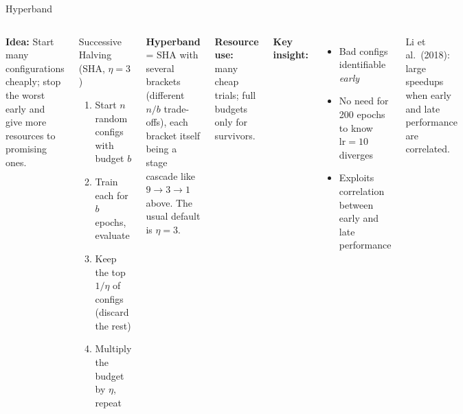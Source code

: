 \documentclass[aspectratio=169,11pt]{beamer}
\newcommand{\emphc}[1]{\textcolor{harvardcrimson}{#1}}
\begin{document}
\begin{frame}{Hyperband}
\footnotesize
\begin{columns}[T]
\textbf{Idea:} Start many configurations cheaply; \emphc{stop the worst early} and give more resources to promising ones.

\vspace{0.05cm}
\begin{block}{Successive Halving (SHA, $\eta=3$)}
\begin{enumerate}\itemsep0pt
    \item Start $n$ random configs with budget $b$
    \item Train each for $b$ epochs, evaluate
    \item \emphc{Keep the top $1/\eta$} of configs (discard the rest)
    \item Multiply the budget by $\eta$, repeat
\end{enumerate}
\end{block}

\textbf{Hyperband} = SHA with several brackets (different $n/b$ trade-offs), each bracket itself being a stage cascade like $9 \to 3 \to 1$ above.  The usual default is $\eta=3$.

\textbf{Resource use:} many cheap trials; full budgets only for survivors.

\textbf{Key insight:}
\begin{itemize}\itemsep0pt
    \item Bad configs identifiable \emph{early}
    \item No need for 200 epochs to know $\mathrm{lr}\!=\!10$ diverges
    \item Exploits \emphc{correlation} between early and late performance
\end{itemize}

{\scriptsize Li et al.\ (2018): large speedups when early and late performance are correlated.}
\end{columns}
\end{frame}
\end{document}
